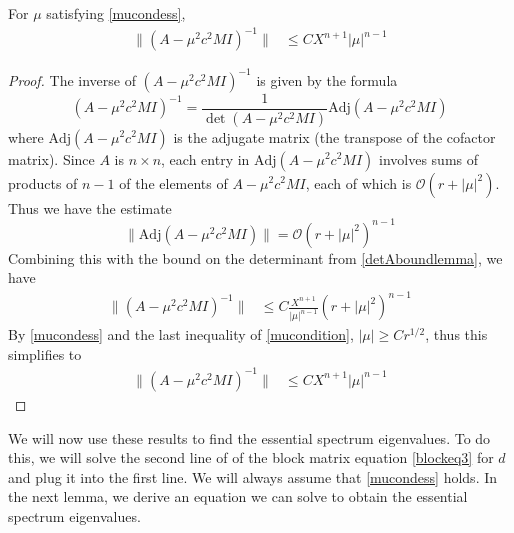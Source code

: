 \documentclass[thesis.tex]{subfiles}
\begin{document}
\begin{lemma}\label{Ainvboundlemma}
For $\mu$ satisfying \cref{mucondess},
\begin{align}\label{Ainvbound1}
\|(A - \mu^2 c^2 M I)^{-1}\| &\leq C X^{n+1} |\mu|^{n-1}
\end{align}
\begin{proof}
The inverse of $(A - \mu^2 c^2 M I)^{-1}$ is given by the formula
\[
(A - \mu^2 c^2 M I)^{-1} = \frac{1}{\det(A - \mu^2 c^2 M I)}\text{Adj}(A - \mu^2 c^2 M I)
\]
where $\text{Adj}(A - \mu^2 c^2 M I)$ is the adjugate matrix (the transpose of the cofactor matrix). Since $A$ is $n \times n$, each entry in $\text{Adj}(A - \mu^2 c^2 M I)$ involves sums of products of $n-1$ of the elements of $A - \mu^2 c^2 M I$, each of which is $\mathcal{O}(r + |\mu|^2)$. Thus we have the estimate
\[
\| \text{Adj}(A - \mu^2 c^2 M I)\| = \mathcal{O}(r + |\mu|^2)^{n-1}
\]
Combining this with the bound on the determinant from \cref{detAboundlemma}, we have
\begin{align*}
\|(A - \mu^2 c^2 M I)^{-1}\| &\leq C \frac{X^{n+1}}{|\mu|^{n-1}} (r + |\mu|^2)^{n-1}
\end{align*}
By \cref{mucondess} and the last inequality of \cref{mucondition}, $|\mu| \geq C r^{1/2}$, thus this simplifies to
\begin{align*}
\|(A - \mu^2 c^2 M I)^{-1}\| &\leq C X^{n+1} |\mu|^{n-1}
\end{align*}
\end{proof}
\end{lemma}

We will now use these results to find the essential spectrum eigenvalues. To do this, we will solve the second line of of the block matrix equation \eqref{blockeq3} for $d$ and plug it into the first line. We will always assume that \cref{mucondess} holds. In the next lemma, we derive an equation we can solve to obtain the essential spectrum eigenvalues.
\end{document}

